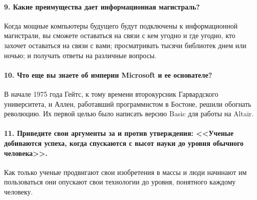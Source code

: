     \paragraph{9. Какие преимущества дает информационная магистраль?}
    Когда мощные компьютеры будущего будут подключены к информационной магистрали, вы сможете оставаться на связи с кем угодно и где угодно, кто захочет оставаться на связи с вами; просматривать тысячи библиотек днем или ночью; и получать ответы на различные вопросы.
    
    \paragraph{10. Что еще вы знаете об империи Microsoft и ее основателе?}
    В начале 1975 года Гейтс, к тому времени второкурсник Гарвардского университета, и Аллен, работавший программистом в Бостоне, решили обогнать революцию. Их первой целью было написать версию Basic для работы на Altair.
    
    \paragraph{11. Приведите свои аргументы за и против утверждения: <<Ученые добиваются успеха, когда спускаются с высот науки до уровня обычного человека>>.} 
    Как только ученые продвигают свои изобретения в массы и люди начинают им пользоваться они опускают свои технологии до уровня, понятного каждому человеку.

